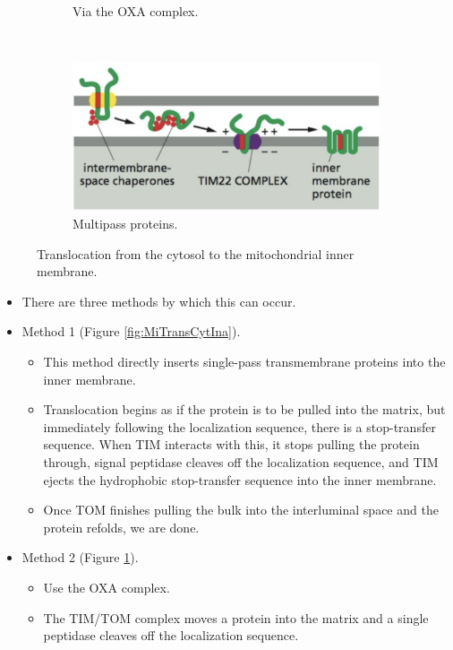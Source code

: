 \documentclass[../notes.tex]{subfiles}
\begin{document}
\begin{itemize}
\begin{figure}[H]
\begin{subfigure}[b]{0.4\linewidth}
            \caption{Via the OXA complex.}
            \label{fig:MiTransCytInb}
        \end{subfigure}\\[1em]
        \begin{subfigure}[b]{0.4\linewidth}
            \centering
            \includegraphics[width=0.85\linewidth]{../ExtFiles/MiTransCytInc.png}
            \caption{Multipass proteins.}
            \label{fig:MiTransCytInc}
        \end{subfigure}
        \caption{Translocation from the cytosol to the mitochondrial inner membrane.}
        \label{fig:MiTransCytIn}
    \end{figure}
    \begin{itemize}
        \item There are three methods by which this can occur.
        \item Method 1 (Figure \ref{fig:MiTransCytIna}).
        \begin{itemize}
            \item This method directly inserts single-pass transmembrane proteins into the inner membrane.
            \item Translocation begins as if the protein is to be pulled into the matrix, but immediately following the localization sequence, there is a stop-transfer sequence. When TIM interacts with this, it stops pulling the protein through, signal peptidase cleaves off the localization sequence, and TIM ejects the hydrophobic stop-transfer sequence into the inner membrane.
            \item Once TOM finishes pulling the bulk into the interluminal space and the protein refolds, we are done.
        \end{itemize}
        \item Method 2 (Figure \ref{fig:MiTransCytInb}).
        \begin{itemize}
            \item Use the OXA complex.
            \item The TIM/TOM complex moves a protein into the matrix and a single peptidase cleaves off the localization sequence.

\end{itemize}
\end{itemize}
\end{itemize}
\end{document}
